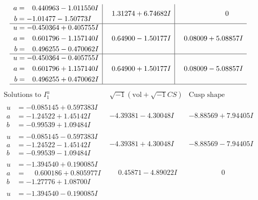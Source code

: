 \documentclass[1p]{elsarticle_modified}
\theoremstyle{definition}
\newcommand{\I}{\sqrt{-1}}
\begin{document}
$$\begin{array}{c|c|c}
\begin{aligned}
a &= \phantom{-}0.440963 - 1.011550 I \\
b &= -1.01477 - 1.50773 I\end{aligned}
 & \phantom{-}1.31274 + 6.74682 I & \phantom{-0.000000 } 0 \\ \hline\begin{aligned}
u &= -0.450364 + 0.405755 I \\
a &= \phantom{-}0.601796 - 1.157140 I \\
b &= \phantom{-}0.496255 - 0.470062 I\end{aligned}
 & \phantom{-}0.64900 - 1.50177 I & \phantom{-}0.08009 + 5.08857 I \\ \hline\begin{aligned}
u &= -0.450364 - 0.405755 I \\
a &= \phantom{-}0.601796 + 1.157140 I \\
b &= \phantom{-}0.496255 + 0.470062 I\end{aligned}
 & \phantom{-}0.64900 + 1.50177 I & \phantom{-}0.08009 - 5.08857 I\\
 \hline 
 \end{array}$$\newpage$$\begin{array}{c|c|c}  
\text{Solutions to }I^u_{1}& \I (\text{vol} + \sqrt{-1}CS) & \text{Cusp shape}\\
 \hline 
\begin{aligned}
u &= -0.085145 + 0.597383 I \\
a &= -1.24522 + 1.45142 I \\
b &= -0.99539 + 1.09484 I\end{aligned}
 & -4.39381 - 4.30048 I & -8.88569 + 7.94405 I \\ \hline\begin{aligned}
u &= -0.085145 - 0.597383 I \\
a &= -1.24522 - 1.45142 I \\
b &= -0.99539 - 1.09484 I\end{aligned}
 & -4.39381 + 4.30048 I & -8.88569 - 7.94405 I \\ \hline\begin{aligned}
u &= -1.394540 + 0.190085 I \\
a &= \phantom{-}0.600186 + 0.805977 I \\
b &= -1.27776 + 1.08700 I\end{aligned}
 & \phantom{-}0.45871 - 4.89022 I & \phantom{-0.000000 } 0 \\ \hline\begin{aligned}
u &= -1.394540 - 0.190085 I \\

\end{aligned}
\end{array}$$
\end{document}
